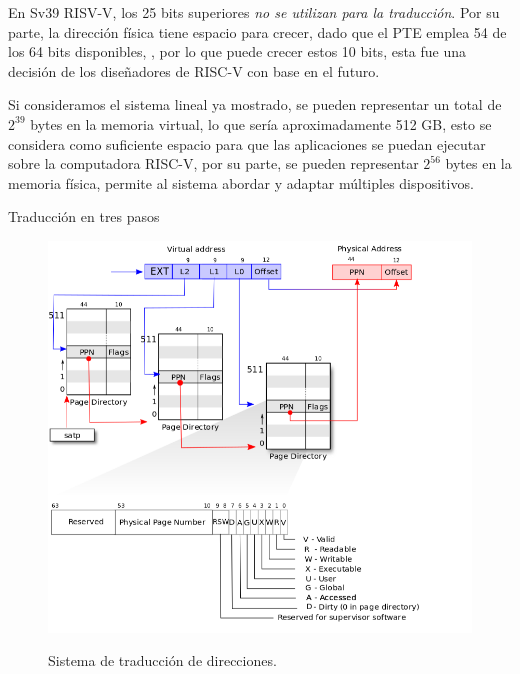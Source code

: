 \documentclass{libs/ufc_format}
\begin{document}
\begin{frame}{}
  En Sv39 RISV-V, los 25 bits superiores \emph{no se utilizan para la traducción}. Por su parte, la dirección física tiene espacio para crecer, dado que el PTE emplea 54 de los 64 bits disponibles, , por lo que puede crecer estos 10 bits, esta fue una decisión de los diseñadores de RISC-V con base en el futuro.

  \vspace{0.3cm}

  Si consideramos el sistema lineal ya mostrado, se pueden representar un total de $2^{39}$ bytes en la memoria virtual, lo que sería aproximadamente 512 GB, esto se considera como suficiente espacio para que las aplicaciones se puedan ejecutar sobre la computadora RISC-V, por su parte, se pueden representar $2^{56}$ bytes en la memoria física, permite al sistema abordar y adaptar múltiples dispositivos. \cite{xv6_book} \newline
\end{frame}
\begin{frame}{Traducción en tres pasos}
  \begin{figure}
    \centering
    \caption{Sistema de traducción de direcciones. \cite{xv6_book}}
    \includegraphics[scale=0.23]{libs/img/riscv_pagetable.png}
    \label{fig:sistema_arbol}
  \end{figure}
\end{frame}
\end{document}
